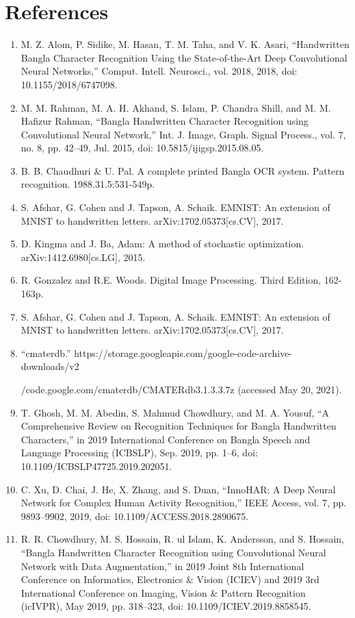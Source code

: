 \documentclass{article}
\begin{document}
\section{References}

\begin{enumerate}
\item M. Z. Alom, P. Sidike, M. Hasan, T. M. Taha, and V. K. Asari, “Handwritten Bangla Character Recognition Using the State-of-the-Art Deep Convolutional Neural Networks,” Comput. Intell. Neurosci., vol. 2018, 2018, doi: 10.1155/2018/6747098.
\item M. M. Rahman, M. A. H. Akhand, S. Islam, P. Chandra Shill, and M. M. Hafizur Rahman, “Bangla Handwritten Character Recognition using Convolutional Neural Network,” Int. J. Image, Graph. Signal Process., vol. 7, no. 8, pp. 42–49, Jul. 2015, doi: 10.5815/ijigsp.2015.08.05.
\item B. B. Chaudhuri & U. Pal. A complete printed Bangla OCR system. Pattern recognition.    1988.31.5:531-549p.
\item S. Afshar, G. Cohen and J. Tapson, A. Schaik. EMNIST: An extension of MNIST to  handwritten letters. arXiv:1702.05373[cs.CV], 2017.
\item D. Kingma and J. Ba, Adam: A method of stochastic optimization. arXiv:1412.6980[cs.LG], 2015.
\item R. Gonzalez and R.E. Woods. Digital Image Processing. Third Edition, 162-163p.
\item S. Afshar, G. Cohen and J. Tapson, A. Schaik. EMNIST: An extension of MNIST to handwritten letters. arXiv:1702.05373[cs.CV], 2017.
\item “cmaterdb.” 
https://storage.googleapis.com/google-code-archive-downloads/v2

/code.google.com/cmaterdb/CMATERdb3.1.3.3.7z (accessed May 20, 2021).
\item T. Ghosh, M. M. Abedin, S. Mahmud Chowdhury, and M. A. Yousuf, “A Comprehensive Review on Recognition Techniques for Bangla Handwritten Characters,” in 2019 International Conference on Bangla Speech and Language Processing (ICBSLP), Sep. 2019, pp. 1–6, doi: 10.1109/ICBSLP47725.2019.202051.
\item C. Xu, D. Chai, J. He, X. Zhang, and S. Duan, “InnoHAR: A Deep Neural Network for Complex Human Activity Recognition,” IEEE Access, vol. 7, pp. 9893–9902, 2019, doi: 10.1109/ACCESS.2018.2890675.
\item R. R. Chowdhury, M. S. Hossain, R. ul Islam, K. Andersson, and S. Hossain, “Bangla Handwritten Character Recognition using Convolutional Neural Network with Data Augmentation,” in 2019 Joint 8th International Conference on Informatics, Electronics & Vision (ICIEV) and 2019 3rd International Conference on Imaging, Vision & Pattern Recognition (icIVPR), May 2019, pp. 318–323, doi: 10.1109/ICIEV.2019.8858545.


\end{enumerate}
\end{document}
